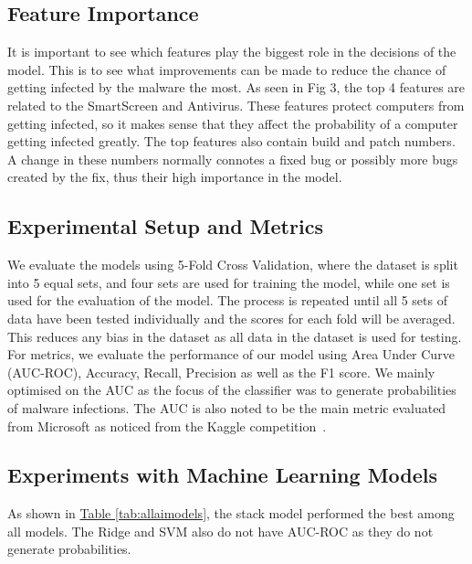 \documentclass[pdflatex,sn-basic,Numbered]{sn-jnl}%
\theoremstyle{thmstyleone}%
\theoremstyle{thmstyletwo}%
\theoremstyle{thmstylethree}%
\newcommand{\reftable}[1]{\hyperref[#1]{Table \ref*{#1}}}
\begin{document}
\subsection{Feature Importance}\label{subsec:feature-importance}
It is important to see which features play the biggest role in the decisions of the model.
This is to see what improvements can be made to reduce the chance of getting infected by the malware the most.
As seen in Fig 3, the top 4 features are related to the SmartScreen and Antivirus.
These features protect computers from getting infected, so it makes sense that they affect the probability of a computer getting infected greatly.
The top features also contain build and patch numbers.
A change in these numbers normally connotes a fixed bug or possibly more bugs created by the fix, thus their high importance in the model.

\subsection{Experimental Setup and Metrics}\label{subsec:experimental-setup-and-metrics}
We evaluate the models using 5-Fold Cross Validation, where the dataset is split into 5 equal sets, and four sets are used for training the model, while one set is used for the evaluation of the model.
The process is repeated until all 5 sets of data have been tested individually and the scores for each fold will be averaged.
This reduces any bias in the dataset as all data in the dataset is used for testing.
For metrics, we evaluate the performance of our model using Area Under Curve (AUC-ROC), Accuracy, Recall, Precision as well as the F1 score.
We mainly optimised on the AUC as the focus of the classifier was to generate probabilities of malware infections.
The AUC is also noted to be the main metric evaluated from Microsoft as noticed from the Kaggle competition~\cite{microsoft-malware-prediction}.


\subsection{Experiments with Machine Learning Models}\label{subsec:experiments-with-machine-learning-models}
As shown in \reftable{tab:allaimodels}, the stack model performed the best among all models.
The Ridge and SVM also do not have AUC-ROC as they do not generate probabilities.
\end{document}
